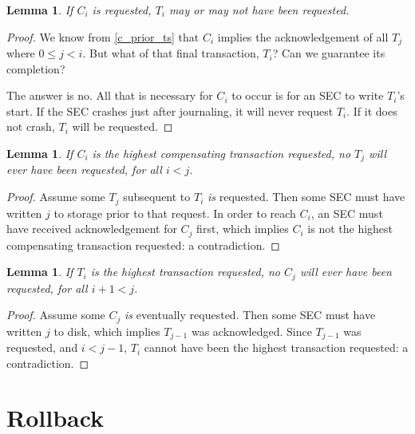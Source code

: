 \documentclass{article}
\newtheorem{lemma}[theorem]{Lemma}
\begin{document}
\begin{lemma}
\label{c_maybe_t}
If $C_i$ is requested, $T_i$ may or may not have been requested.
\end{lemma}

\begin{proof}

We know from \ref{c_prior_ts} that $C_i$ implies the acknowledgement of all
$T_j$ where $0 \le j < i$. But what of that final transaction, $T_i$? Can we
guarantee its completion?

The answer is no. All that is necessary for $C_i$ to occur is for an SEC to
write $T_i$'s start. If the SEC crashes just after journaling, it will never
request $T_i$. If it does not crash, $T_i$ will be requested.

\end{proof}


\begin{lemma}
\label{max_c_later_ts}
If $C_i$ is the highest compensating transaction requested, no $T_j$ will ever
have been requested, for all $i < j$.
\end{lemma}

\begin{proof}

Assume some $T_j$ subsequent to $T_i$ \textit{is} requested. Then some SEC must
have written $j$ to storage prior to that request. In order to reach $C_i$, an SEC must have received acknowledgement for $C_j$ first, which implies $C_i$ is not the highest compensating transaction requested: a contradiction.

\end{proof}

\begin{lemma}
\label{max_c_later_cs}
If $T_i$ is the highest transaction requested, no $C_j$ will ever have been
requested, for all $i + 1 < j$.
\end{lemma}

\begin{proof}

Assume some $C_j$ \textit{is} eventually requested. Then some SEC must have written $j$ to disk, which implies $T_{j-1}$ was acknowledged. Since $T_{j-1}$ was requested, and $i < j - 1$, $T_i$ cannot have been the highest transaction requested: a contradiction.

\end{proof}

\section{Rollback}
\end{document}
